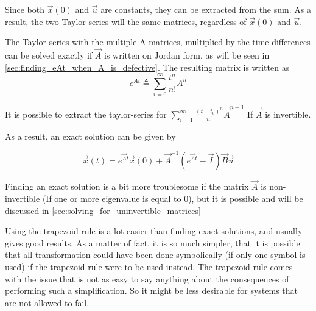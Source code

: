 Since both $\Vec{x}(0)$ and $\Vec{u}$ are constants, they can be extracted from the sum. As a result, the two Taylor-series will the same matrices, regardless of $\Vec{x}(0)$ and $\Vec{u}$. 

The Taylor-series with the multiple A-matrices, multiplied by the time-differences can be solved exactly if $\Vec{A}$ is written on Jordan form, as will be seen in \cref{sec:finding_eAt_when_A_is_defective}.
The resulting matrix is written as 
\begin{equation}
 e^{ \Vec{A}t} \triangleq \sum_{i=0}^\infty \frac{t^n}{n!}A^n
\end{equation}{}

It is possible to extract the taylor-series for $\sum_{i=1}^\infty \frac{(t-t_0)^n}{n!} \Vec{A}^{n-1}$ If $\Vec{A}$ is invertible.

As a result, an exact solution can be given by 

\begin{equation}
 \Vec{x}(t) = e^{\Vec{A}t}\Vec{x}(0) + \Vec{A}^{-1}( e^{\Vec{A}t} -\Vec{I})\Vec{B}\Vec{u}
\end{equation}{}

Finding an exact solution is a bit more troublesome if the matrix $\Vec{A}$ is non-invertible (If one or more eigenvalue is equal to 0), but it is possible and will be discussed in \cref{sec:solving_for_uninvertible_matrices} 


Using the trapezoid-rule is a lot easier than finding exact solutions, and usually gives good results. As a matter of fact, it is so much simpler, that it is possible that all transformation could have been done symbolically (if only one symbol is used) if the trapezoid-rule were to be used instead. The trapezoid-rule comes with the issue that is not as easy to say anything about the consequences of performing such a simplification. So it might be less desirable for systems that are not allowed to fail. 

